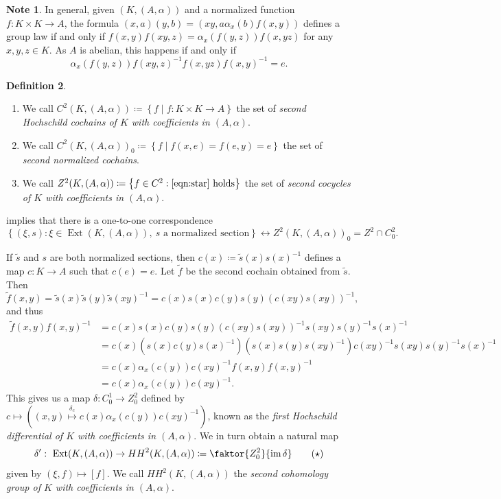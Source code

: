 \documentclass[10pt,letterpaper,cm]{nupset}
\theoremstyle{definition}
\newtheorem{definition}{Definition}[subsection]
\newtheorem{note}[definition]{Note}
\theoremstyle{theorem}
\theoremstyle{remark}
\newcommand{\1}{\mathbf{1}}
\newcommand{\0}{\vec 0}
\DeclareMathOperator{\ext}{Ext}
\DeclareMathOperator{\im}{im}
\begin{document}
\begin{note}\label{lr}
In general, given $\left(K, \left(A, \alpha\right)\right)$ and a normalized function $f: K \times K \to A$, the formula $\left(x, a\right)\left(y, b\right) = \left(xy, a \alpha_x(b)f(x,y)\right)$ defines a group law if and only if $f(x,y)f(xy, z) = \alpha_x(f(y,z))f(x, yz)$ for any $x, y, z \in K$. As $A$ is abelian, this happens if and only if  
\[ \label{eqn:star}
\alpha_x(f(y, z))f(xy, z)^{-1} f(x, yz)f(x, y)^{-1} = e. \tag{$\ast$}
\]
\end{note}

\begin{definition} $ $
\begin{enumerate}
\item We call $C^2(K, (A, \alpha))\coloneqq  \left\{f \mid f: K \times K \to A\right\}$ the set of \textit{second Hochschild cochains of $K$ with coefficients in $\left(A, \alpha\right)$}. 
\item We call $C^2(K, (A, \alpha))_0 \coloneqq  \left\{f \mid f(x, e) = f(e, y) =e\right\}$ the set of \textit{second normalized cochains}.
\item We call $Z^2(K, (A, \alpha)) \coloneqq  \left\{f \in C^2 : \eqref{eqn:star} \text{ holds}\right\}$ the set of \textit{second cocycles of $K$ with coefficients in $\left(A, \alpha\right)$}.
\end{enumerate}
\end{definition}


 implies that there is a one-to-one correspondence 
\[
\left\{(\xi, s) : \xi \in \ext(K, (A, \alpha)), \ s \text{ a normalized section}\right\} \longleftrightarrow Z^2(K, (A, \alpha))_0 = Z^2 \cap C^2_0
.\]

If $\tilde{s}$ and $s$ are both normalized sections, then $c(x)\coloneqq \tilde{s}(x)s(x)^{-1}$ defines a map $c : K \to A$ such that $c(e) =e$. Let $\tilde{f}$ be the second cochain obtained from $\tilde{s}$. Then  $$\tilde{f}(x, y) = \tilde{s}(x)\tilde{s}(y)\tilde{s}(xy)^{-1} =c(x)s(x)c(y)s(y)(c(xy)s(xy))^{-1}, $$ and thus 
\begin{align*} \tilde{f}(x, y)f(x,y)^{-1} & = c(x)s(x)c(y)s(y)(c(xy)s(xy))^{-1}s(xy)s(y)^{-1}s(x)^{-1}
\\ &  = c(x)(s(x)c(y)s(x)^{-1})(s(x)s(y)s(xy)^{-1})c(xy)^{-1}s(xy)s(y)^{-1}s(x)^{-1}
\\ &  = c(x)\alpha_x(c(y))c(xy)^{-1}f(x,y)f(x,y)^{-1} 
\\ & =c(x)\alpha_x(c(y))c(xy)^{-1}.
\end{align*}
This gives us a map $\delta: C^1_0 \to Z^2_0$ defined by $c \mapsto \left((x, y) \overset{\delta_c}{\longmapsto}   c(x)\alpha_x(c(y))c(xy)^{-1}\right)$, known as the \textit{first Hochschild differential of $K$ with coefficients in $\left(A, \alpha\right)$}.  
We in turn obtain a natural map 
\[\label{eqn:HH}
\delta':\ \ext(K, (A, \alpha)) \to {HH}^2(K, (A, \alpha)) \coloneqq  \faktor{Z^2_0}{\im{\delta}}
\tag{$\star$}
\] given by $\left(\xi, f\right) \mapsto [f]$. We call ${HH}^2(K, (A, \alpha))$ the \textit{second cohomology group of $K$ with coefficients in $\left(A, \alpha\right)$}.
\end{document}

